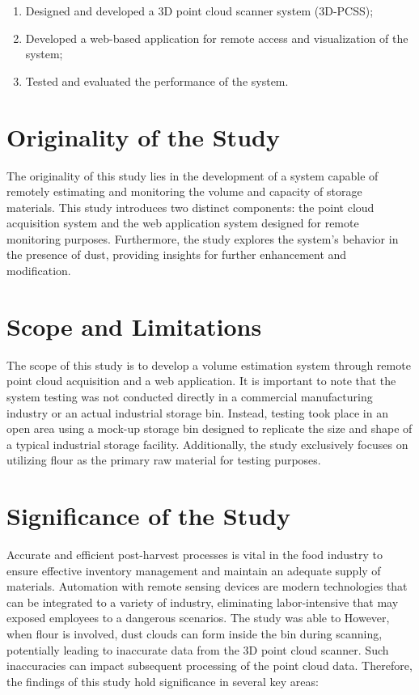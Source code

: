 \begin{enumerate}
	\item Designed and developed a 3D point cloud scanner system (3D-PCSS);
	\item Developed a web-based application for remote access and visualization of the system;
	\item Tested and evaluated the performance of the system.
\end{enumerate}

\section{Originality of the Study}
\label{intro:sec:Originality of the Study}
The originality of this study lies in the development of a system capable of remotely estimating and monitoring the volume and capacity of storage materials. This study introduces two distinct components: the point cloud acquisition system and the web application system designed for remote monitoring purposes. Furthermore, the study explores the system's behavior in the presence of dust, providing insights for further enhancement and modification.

\section{Scope and Limitations}
\label{intro:sec:Scope and Limitations}
The scope of this study is to develop a volume estimation system through remote point cloud acquisition and a web application. It is important to note that the system testing was not conducted directly in a commercial manufacturing industry or an actual industrial storage bin. Instead, testing took place in an open area using a mock-up storage bin designed to replicate the size and shape of a typical industrial storage facility. Additionally, the study exclusively focuses on utilizing flour as the primary raw material for testing purposes.


\section{Significance of the Study}
\label{intro:sec:Significance of the Study}
Accurate and efficient post-harvest processes is vital in the food industry to ensure effective inventory management and maintain an adequate supply of materials. Automation with remote sensing devices are modern technologies that can be integrated to a variety of industry, eliminating labor-intensive that may exposed employees to a dangerous scenarios. The study was able to  However, when flour is involved, dust clouds can form inside the bin during scanning, potentially leading to inaccurate data from the 3D point cloud scanner. Such inaccuracies can impact subsequent processing of the point cloud data. Therefore, the findings of this study hold significance in several key areas:

